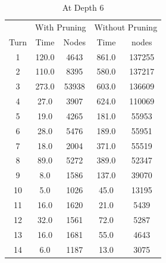 \documentclass{article}
\begin{document}
\begin{table}[H]
    \caption{At Depth 6}
    \centering
    \begin{tabular}{c c c c c}
        \toprule
                & \multicolumn{2}{c}{With Pruning} & \multicolumn{2}{c}{Without Pruning}                    \\
        \cmidrule{2-3}
        \cmidrule{4-5}
        Turn    & Time                             & Nodes                               & Time  & nodes    \\
        \midrule
        1       & 120.0                            & 4643                                & 861.0 & 137255   \\
        2       & 110.0                            & 8395                                & 580.0 & 137217   \\
        3       & 273.0                            & 53938                               & 603.0 & 136609   \\
        4       & 27.0                             & 3907                                & 624.0 & 110069   \\
        5       & 19.0                             & 4265                                & 181.0 & 55953    \\
        6       & 28.0                             & 5476                                & 189.0 & 55951    \\
        7       & 18.0                             & 2004                                & 371.0 & 55519    \\
        8       & 89.0                             & 5272                                & 389.0 & 52347    \\
        9       & 8.0                              & 1586                                & 137.0 & 39070    \\
        10      & 5.0                              & 1026                                & 45.0  & 13195    \\
        11      & 16.0                             & 1620                                & 21.0  & 5439     \\
        12      & 32.0                             & 1561                                & 72.0  & 5287     \\
        13      & 16.0                             & 1681                                & 55.0  & 4643     \\
        14      & 6.0                              & 1187                                & 13.0  & 3075     \\

\end{tabular}
\end{table}
\end{document}

